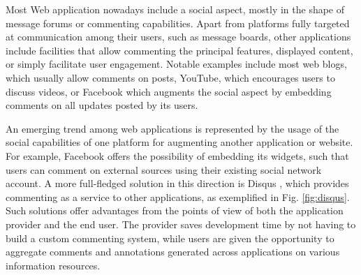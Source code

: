 
Most Web application nowadays include a social aspect, mostly in the shape of
message forums or commenting capabilities. Apart from platforms fully targeted
at communication among their users, such as message boards, other applications
include facilities that allow commenting the principal features, displayed
content, or simply facilitate user engagement.  Notable examples include most
web blogs, which usually allow comments on posts, YouTube, which encourages
users to discuss videos, or Facebook which augments the social aspect by
embedding comments on all updates posted by its users.

An emerging trend among web applications is represented by the usage of the
social capabilities of one platform for augmenting another application or
website. For example, Facebook offers the possibility of embedding its widgets,
such that users can comment on external sources using their existing social
network account. A more full-fledged solution in this direction is Disqus
\cite{ref:disqus}, which provides commenting as a service to other
applications, as exemplified in Fig. \ref{fig:disqus}. Such solutions offer
advantages from the points of view of both the application provider and the end
user. The provider saves development time by not having to build a custom
commenting system, while users are given the opportunity to aggregate comments
and annotations generated across applications on various information resources.

